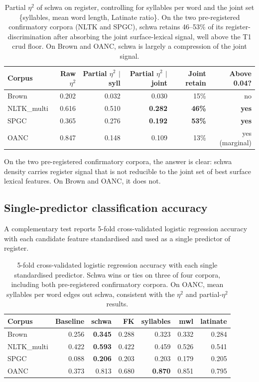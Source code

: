 \documentclass[11pt,a4paper]{article}
\begin{document}
\begin{table}[ht]
\centering
\small
\begin{tabular}{lrrrrr}
\toprule
Corpus & Raw \(\eta^2\) & Partial \(\eta^2\) \(\mid\)syll & Partial \(\eta^2\) \(\mid\)joint
       & Joint retain & Above 0.04? \\
\midrule
Brown & 0.202 & 0.032 & 0.030 & 15\% & no \\
NLTK\_multi & 0.616 & 0.510 & \textbf{0.282} & \textbf{46\%} & \textbf{yes} \\
SPGC & 0.365 & 0.276 & \textbf{0.192} & \textbf{53\%} & \textbf{yes} \\
OANC & 0.847 & 0.148 & 0.109 & 13\% & yes (marginal) \\
\bottomrule
\end{tabular}
\caption{Partial \(\eta^2\) of schwa on register, controlling for
syllables per word and the joint set
\{syllables, mean word length, Latinate ratio\}. On the two
pre-registered confirmatory corpora (NLTK and SPGC), schwa retains
46--53\% of its register-discrimination after absorbing the joint
surface-lexical signal, well above the T1 crud floor. On Brown and
OANC, schwa is largely a compression of the joint signal.}
\label{tab:partial}
\end{table}

On the two pre-registered confirmatory corpora, the answer is clear:
schwa density carries register signal that is not reducible to the
joint set of best surface lexical features. On Brown and OANC, it
does not.

\subsection{Single-predictor classification accuracy}

A complementary test reports 5-fold cross-validated logistic regression
accuracy with each candidate feature standardised and used as a single
predictor of register.

\begin{table}[ht]
\centering
\small
\begin{tabular}{lrrrrrr}
\toprule
Corpus & Baseline & schwa & FK & syllables & mwl & latinate \\
\midrule
Brown & 0.256 & \textbf{0.345} & 0.288 & 0.323 & 0.332 & 0.284 \\
NLTK\_multi & 0.422 & \textbf{0.593} & 0.422 & 0.459 & 0.526 & 0.541 \\
SPGC & 0.088 & \textbf{0.206} & 0.203 & 0.203 & 0.179 & 0.205 \\
OANC & 0.373 & 0.813 & 0.680 & \textbf{0.870} & 0.851 & 0.795 \\
\bottomrule
\end{tabular}
\caption{5-fold cross-validated logistic regression accuracy with each
single standardised predictor. Schwa wins or ties on three of four
corpora, including both pre-registered confirmatory corpora. On OANC,
mean syllables per word edges out schwa, consistent with the
\(\eta^2\) and partial-\(\eta^2\) results.}
\label{tab:cv}
\end{table}
\end{document}
